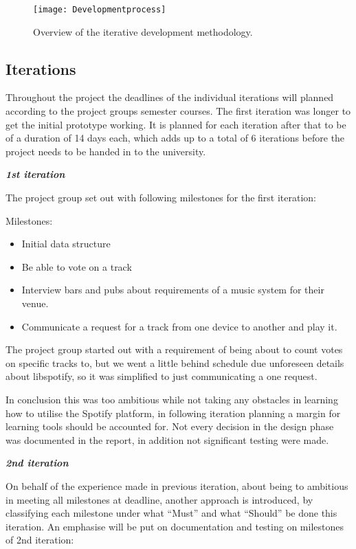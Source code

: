 \begin{figure}[hbtp]
  \centering
  \texttt{[image: Developmentprocess]}
  \caption{Overview of the iterative development methodology.}\label{fig:developmentprocess}
\end{figure}

\subsection{Iterations}

Throughout the project the deadlines of the individual iterations will planned according to the project groups semester courses. The first iteration was longer to get the initial prototype working. It is planned for each iteration after that to be of a duration of 14 days each, which adds up to a total of 6 iterations before the project needs to be handed in to the university.

\textit{\textbf{1st iteration}}

	The project group set out with following milestones for the first iteration:

	Milestones:
	\begin{itemize}
		\item Initial data structure
		\item Be able to vote on a track
		\item Interview bars and pubs about requirements of a music system for their venue.
		\item Communicate a request for a track from one device to another and play it.
	\end{itemize}

	The project group started out with a requirement of being about to count votes on specific tracks to, but we went a little behind schedule due unforeseen details about libspotify, so it was simplified to just communicating a one request.

	In conclusion this was too ambitious while not taking any obstacles in learning how to utilise the Spotify platform, in following iteration planning a margin for learning tools should be accounted for. Not every decision in the design phase was documented in the report, in addition not significant testing were made.

\noindent\textit{\textbf{2nd iteration}}

	On behalf of the experience made in previous iteration, about being to ambitious in meeting all milestones at deadline, another approach is introduced, by classifying each milestone under what \enquote{Must} and what \enquote{Should} be done this iteration. An emphasise will be put on documentation and testing on milestones of 2nd iteration:

